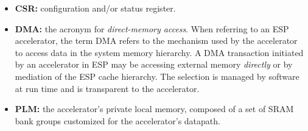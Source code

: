 \begin{itemize}
    {\it valid} are set. Both master and slave have the ability to delay the
    transfer of a beat for as many cycles as necessary.
  \item {\bf CSR:} configuration and/or status register.
  \item {\bf DMA:} the acronym for {\it direct-memory access}. When referring to
    an ESP accelerator, the term DMA refers to the mechanism used by the
    accelerator to access data in the system memory hierarchy. A DMA transaction
    initiated by an accelerator in ESP may be accessing external memory
    {\em directly} or by mediation of the ESP cache hierarchy. The selection is
    managed by software at run time and is transparent to the accelerator.
  \item {\bf PLM:} the accelerator's private local memory, composed of a set of
    SRAM bank groups customized for the accelerator's datapath.
\end{itemize}
